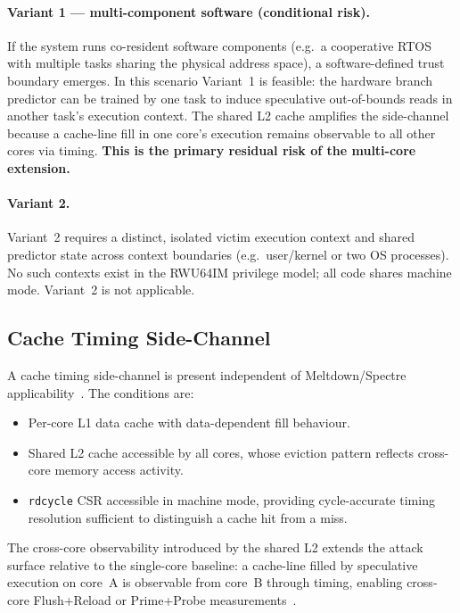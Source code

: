 \paragraph{Variant 1 — multi-component software (conditional risk).}
If the system runs co-resident software components (e.g.\ a cooperative
\mbox{RTOS} with multiple tasks sharing the physical address space), a
software-defined trust boundary emerges. In this scenario Variant~1 is
feasible: the hardware branch predictor can be trained by one task to induce
speculative out-of-bounds reads in another task's execution context. The shared
\mbox{L2} cache amplifies the side-channel because a cache-line fill in one
core's execution remains observable to all other cores via timing. \textbf{This
  is the primary residual risk of the multi-core extension.}

\paragraph{Variant 2.}
Variant~2 requires a distinct, isolated victim execution context and shared
predictor state across context boundaries (e.g.\ user/kernel or two OS
processes). No such contexts exist in the RWU64IM privilege model; all code
shares machine mode. Variant~2 is not applicable.

\subsection{Cache Timing Side-Channel}
\label{subsec:cache_sidechannel}

A cache timing side-channel is present independent of Meltdown/Spectre
applicability~\cite{gruss2016flushflush,arm2018cache}. The conditions are:

\begin{itemize}
  \item Per-core \mbox{L1} data cache with data-dependent fill behaviour.
  \item Shared \mbox{L2} cache accessible by all cores, whose eviction pattern reflects
        cross-core memory access activity.
  \item \texttt{rdcycle} CSR accessible in machine mode, providing cycle-accurate
        timing resolution sufficient to distinguish a cache hit from a miss.
\end{itemize}

The cross-core observability introduced by the shared \mbox{L2} extends the
attack surface relative to the single-core baseline: a cache-line filled by
speculative execution on core~A is observable from core~B through timing,
enabling cross-core Flush+Reload or Prime+Probe
measurements~\cite{gruss2016flushflush}.

